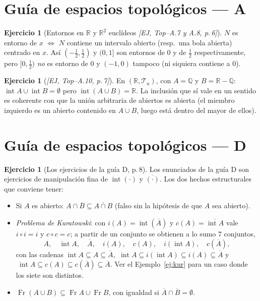 \documentclass[11pt,a4paper]{article}
\theoremstyle{definition}
\newtheorem{ejercicio}[definicion]{Ejercicio}
\theoremstyle{plain}
\newcommand{\fnt}[1]{{\normalfont\small\itshape\color{gray!150!black}[#1]}}
\newcommand{\R}{\mathbb{R}}
\newcommand{\Q}{\mathbb{Q}}
\newcommand{\cl}[1]{\overline{#1}}
\newcommand{\intr}{\operatorname{int}}
\newcommand{\fr}{\operatorname{Fr}}
\newcommand{\tp}{\mathcal{T}}
\begin{document}
\section{Guía de espacios topológicos --- A}

\begin{ejercicio}[Entornos en $\R$ y $\R^2$ euclídeos \fnt{EJ, Top--A.7 y A.8, p.\,6}]
$N$ es entorno de $x$ $\iff$ $N$ contiene un intervalo abierto (resp.\ una bola abierta) centrado en $x$. Así $(-\tfrac12,\tfrac12)$ y $(0,1]$ son entornos de $0$ y de $\tfrac12$ respectivamente, pero $[0,\tfrac12)$ \emph{no} es entorno de $0$ y $(-1,0)$ tampoco (ni siquiera contiene a $0$).
\end{ejercicio}

\begin{ejercicio}[\fnt{EJ, Top--A.10, p.\,7}]
En $(\R,\tp_u)$, con $A=\Q$ y $B=\R-\Q$: $\intr A\cup\intr B=\emptyset$ pero $\intr(A\cup B)=\R$. La inclusión que sí vale en un sentido es coherente con que la unión arbitraria de abiertos es abierta (el miembro izquierdo es un abierto contenido en $A\cup B$, luego está dentro del mayor de ellos).
\end{ejercicio}

\section{Guía de espacios topológicos --- D}

\begin{ejercicio}[Los ejercicios de la guía D, p.\,8]
Los enunciados de la guía D son ejercicios de manipulación fina de $\intr(\cdot)$ y $\cl{(\cdot)}$. Los dos hechos estructurales que conviene tener:
\begin{itemize}[leftmargin=1.4em,itemsep=1pt]
\item Si $A$ es abierto: $A\cap\cl B\subseteq\cl{A\cap B}$ (falso sin la hipótesis de que $A$ sea abierto).
\item \emph{Problema de Kuratowski}: con $i(A)=\intr(\cl A)$ y $c(A)=\cl{\intr A}$ vale $i\circ i=i$ y $c\circ c=c$; a partir de un conjunto se obtienen a lo sumo $7$ conjuntos,
\[
A,\quad \intr A,\quad \cl A,\quad i(A),\quad c(A),\quad i(\intr A),\quad c(\cl A),
\]
con las cadenas $\intr A\subseteq A\subseteq\cl A$, $\ \intr A\subseteq i(\intr A)\subseteq i(A)\subseteq\cl A$ y $\ \intr A\subseteq c(A)\subseteq c(\cl A)\subseteq \cl A$. Ver el Ejemplo~\ref{ej:kur} para un caso donde los siete son distintos.
\item $\fr(A\cup B)\subseteq \fr A\cup \fr B$, con igualdad si $\cl A\cap\cl B=\emptyset$.
\end{itemize}
\end{ejercicio}
\end{document}
